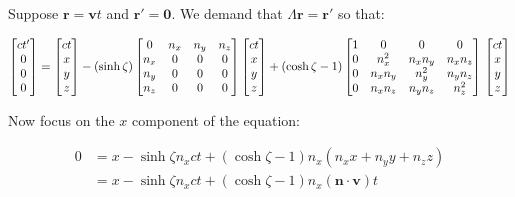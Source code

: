 \documentclass[12pt]{article}
\begin{document}
Suppose $\mathbf{r} = \mathbf{v} t$ and $\mathbf{r}' = \mathbf{0}$. We demand that $\Lambda \mathbf{r} = \mathbf{r}'$ so that:

\begin{equation}
    \begin{bmatrix}
        ct' \\
        0   \\
        0   \\
        0
    \end{bmatrix}
    =
    \begin{bmatrix}
        ct \\
        x  \\
        y  \\
        z
    \end{bmatrix}
    - (\sinh{\zeta})
    \begin{bmatrix}
        0     & n_{x} & n_{y} & n_{z} \\
        n_{x} & 0     & 0     & 0     \\
        n_{y} & 0     & 0     & 0     \\
        n_{z} & 0     & 0     & 0
    \end{bmatrix}
    \begin{bmatrix}
        ct \\
        x  \\
        y  \\
        z
    \end{bmatrix}
    + (\cosh{\zeta} - 1)
    \begin{bmatrix}
        1 & 0          & 0          & 0          \\
        0 & n_{x}^{2}  & n_{x}n_{y} & n_{x}n_{z} \\
        0 & n_{x}n_{y} & n_{y}^{2}  & n_{y}n_{z} \\
        0 & n_{x}n_{z} & n_{y}n_{z} & n_{z}^{2}
    \end{bmatrix} \\
    \begin{bmatrix}
        ct \\
        x  \\
        y  \\
        z
    \end{bmatrix}
\end{equation}

Now focus on the $x$ component of the equation:

\begin{equation}
    \begin{split}
        0 &= x - \sinh{\zeta} n_{x} ct + (\cosh{\zeta} - 1) n_{x} (n_{x} x + n_{y} y + n_{z} z) \\
        &= x - \sinh{\zeta} n_{x} ct + (\cosh{\zeta} - 1) n_{x} (\mathbf{n} \cdot \mathbf{v}) t
    \end{split}
\end{equation}
\end{document}
